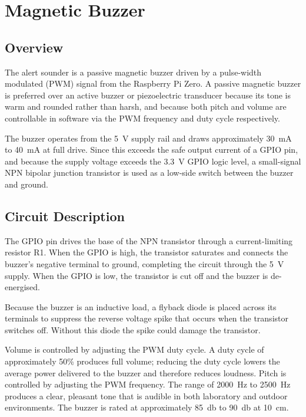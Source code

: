 \documentclass[border=10pt]{standalone}
\begin{document}
\section{Magnetic Buzzer}

\subsection{Overview}

The alert sounder is a passive magnetic buzzer driven by a pulse-width modulated (PWM)
signal from the Raspberry Pi Zero. A passive magnetic buzzer is preferred over an active
buzzer or piezoelectric transducer because its tone is warm and rounded rather than harsh,
and because both pitch and volume are controllable in software via the PWM frequency and
duty cycle respectively.

The buzzer operates from the \SI{5}{\volt} supply rail and draws approximately
\SI{30}{\milli\ampere} to \SI{40}{\milli\ampere} at full drive. Since this exceeds the
safe output current of a GPIO pin, and because the supply voltage exceeds the
\SI{3.3}{\volt} GPIO logic level, a small-signal NPN bipolar junction transistor is
used as a low-side switch between the buzzer and ground.

\subsection{Circuit Description}

The GPIO pin drives the base of the NPN transistor through a current-limiting resistor
R1. When the GPIO is high, the transistor saturates and connects the buzzer's negative
terminal to ground, completing the circuit through the \SI{5}{\volt} supply. When the
GPIO is low, the transistor is cut off and the buzzer is de-energised.

Because the buzzer is an inductive load, a flyback diode is placed across its terminals
to suppress the reverse voltage spike that occurs when the transistor switches off.
Without this diode the spike could damage the transistor.

Volume is controlled by adjusting the PWM duty cycle. A duty cycle of approximately
50\% produces full volume; reducing the duty cycle lowers the average power delivered
to the buzzer and therefore reduces loudness. Pitch is controlled by adjusting the PWM
frequency. The range of \SI{2000}{\hertz} to \SI{2500}{\hertz} produces a clear,
pleasant tone that is audible in both laboratory and outdoor environments. The buzzer
is rated at approximately \SI{85}{\decibel} to \SI{90}{\decibel} at \SI{10}{\centi\meter}.
\end{document}
